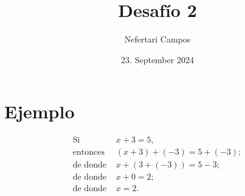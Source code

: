 \documentclass{article}
\title{Desafío 2}
\author{Nefertari Campos}
\date{23. September 2024}
\begin{document}
\maketitle
\section{Ejemplo}
\begin{center}
\begin{equation*}
\begin{aligned}
\text{Si } & x + 3 = 5,\\
\text{entonces } & (x + 3) + (-3) = 5 + (-3);\\
\text{de donde } & x + (3 + (-3)) = 5 - 3;\\
\text{de donde } & x + 0 = 2;\\
\text{de donde } & x = 2.
\end{aligned}
\end{equation*}
\end{center}
\end{document}
